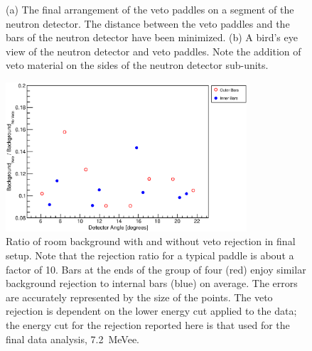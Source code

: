 \begin{figure}[!htbp]
{}
\hspace{1cm}
\caption[Final veto setup.]{(a) The final arrangement of the veto paddles on a segment of the neutron detector.  The distance between the veto paddles and the bars of the neutron detector have been minimized.  (b) A bird's eye view of the neutron detector and veto paddles.  Note the addition of veto material on the sides of the neutron detector sub-units.}
\label{fig:vetoSetup}
\end{figure}

\begin{figure}[!htbp]
\centering
\includegraphics[width=0.8\textwidth]{figures/bkgdRejection_new_legend.eps}
\caption[Improvement in background rejection due to final veto setup.]{Ratio of room background with and without veto rejection in final setup.  Note that the rejection ratio for a typical paddle is about a factor of 10.  Bars at the ends of the group of four (red) enjoy similar background rejection to internal bars (blue) on average.  The errors are accurately represented by the size of the points.  The veto rejection is dependent on the lower energy cut applied to the data; the energy cut for the rejection reported here is that used for the final data analysis, 7.2~MeVee. }
\label{fig:finalBackground}
\end{figure}

